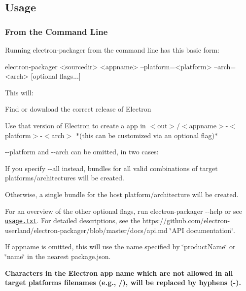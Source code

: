 \subsection*{Usage}

\subsubsection*{From the Command Line}

Running electron-\/packager from the command line has this basic form\+:


\begin{DoxyCode}
electron-packager <sourcedir> <appname> --platform=<platform> --arch=<arch> [optional flags...]
\end{DoxyCode}


This will\+:


\begin{DoxyItemize}
\item Find or download the correct release of Electron
\item Use that version of Electron to create a app in {\ttfamily $<$out$>$/$<$appname$>$-\/$<$platform$>$-\/$<$arch$>$} $\ast$(this can be customized via an optional flag)$\ast$
\end{DoxyItemize}

{\ttfamily -\/-\/platform} and {\ttfamily -\/-\/arch} can be omitted, in two cases\+:


\begin{DoxyItemize}
\item If you specify {\ttfamily -\/-\/all} instead, bundles for all valid combinations of target platforms/architectures will be created.
\item Otherwise, a single bundle for the host platform/architecture will be created.
\end{DoxyItemize}

For an overview of the other optional flags, run {\ttfamily electron-\/packager -\/-\/help} or see \href{https://github.com/electron-userland/electron-packager/blob/master/usage.txt}{\tt usage.\+txt}. For detailed descriptions, see the https\+://github.com/electron-\/userland/electron-\/packager/blob/master/docs/api.\+md \char`\"{}\+A\+P\+I documentation\char`\"{}.

If {\ttfamily appname} is omitted, this will use the name specified by \char`\"{}product\+Name\char`\"{} or \char`\"{}name\char`\"{} in the nearest package.\+json.

{\bfseries Characters in the Electron app name which are not allowed in all target platforms\textquotesingle{} filenames (e.\+g., {\ttfamily /}), will be replaced by hyphens ({\ttfamily -\/}).}

